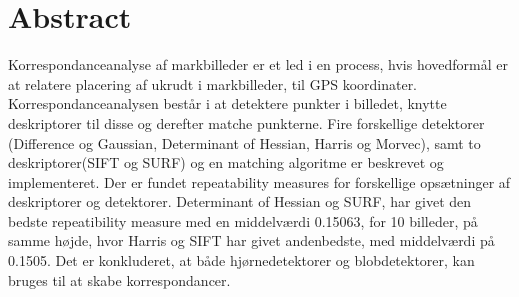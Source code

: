 \chapter{Abstract} \label{sec:abstract}
Korrespondanceanalyse af markbilleder er et led i en process, hvis hovedformål er at relatere placering af ukrudt i markbilleder, til GPS koordinater. Korrespondanceanalysen består i at detektere punkter i billedet, knytte deskriptorer til disse og derefter matche punkterne. Fire forskellige detektorer (Difference og Gaussian, Determinant of Hessian, Harris og Morvec), samt to deskriptorer(SIFT og SURF) og en matching algoritme er beskrevet og implementeret. Der er fundet repeatability measures for forskellige opsætninger af deskriptorer og detektorer. Determinant of Hessian og SURF, har givet den bedste repeatibility measure med en middelværdi 0.15063, for 10 billeder, på samme højde, hvor Harris og SIFT har givet andenbedste, med middelværdi på 0.1505. Det er konkluderet, at både hjørnedetektorer og blobdetektorer, kan bruges til at skabe korrespondancer.